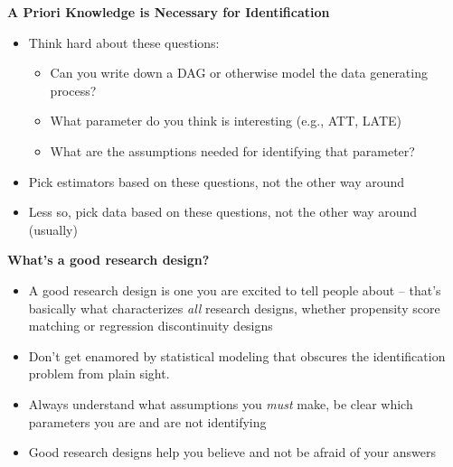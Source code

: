 \documentclass[notes=show]{beamer}
\begin{document}
\begin{frame}[plain]
	\begin{center}
	\textbf{A Priori Knowledge is Necessary for Identification}
	\end{center}
	
	\begin{itemize}
	\item Think hard about these questions: 
		\begin{itemize}
		\item Can you write down a DAG or otherwise model the data generating process?
		\item What parameter do you think is interesting (e.g., ATT, LATE)
		\item What are the assumptions needed for identifying that parameter?
		\end{itemize}
	\item Pick estimators based on these questions, not the other way around
	\item Less so, pick data based on these questions, not the other way around (usually)
	\end{itemize}
\end{frame}


\begin{frame}[plain]
	\begin{center}
	\textbf{What's a good research design?}
	\end{center}
	
	\begin{itemize}
	\item A good research design is one you are excited to tell people about -- that's basically what characterizes \emph{all} research designs, whether propensity score matching or regression discontinuity designs
	\item Don't get enamored by statistical modeling that obscures the identification problem from plain sight.  
	\item Always understand what assumptions you \emph{must} make, be clear which parameters you are and are not identifying
	\item Good research designs help you believe and not be afraid of your answers
	\end{itemize}
\end{frame}
\end{document}
